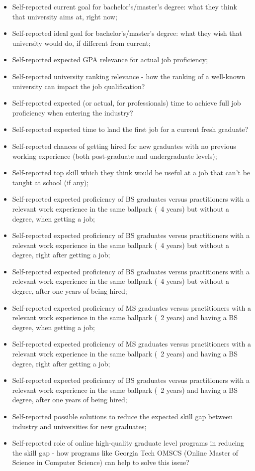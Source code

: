 \documentclass{sigchi}
\begin{document}
\begin{itemize}
	\item Self-reported current goal for bachelor's/master's degree: what they think that university aims at, right now;
	\item Self-reported ideal goal for bachelor's/master's degree: what they wish that university would do, if different from current;
	\item Self-reported expected GPA relevance for actual job proficiency;
	\item Self-reported university ranking relevance - how the ranking of a well-known university can impact the job qualification?
	\item Self-reported expected (or actual, for professionals) time to achieve full job proficiency when entering the industry?
	\item Self-reported expected time to land the first job for a current fresh graduate?
	\item Self-reported chances of getting hired for new graduates with no previous working experience (both post-graduate and undergraduate levels);
	\item Self-reported top skill which they think would be useful at a job that can't be taught at school (if any);
	\item Self-reported expected proficiency of BS graduates versus practitioners with a relevant work experience in the same ballpark (~4 years) but without a degree, when getting a job;
	\item Self-reported expected proficiency of BS graduates versus practitioners with a relevant work experience in the same ballpark (~4 years) but without a degree, right after getting a job;
	\item Self-reported expected proficiency of BS graduates versus practitioners with a relevant work experience in the same ballpark (~4 years) but without a degree, after one years of being hired;
	\item Self-reported expected proficiency of MS graduates versus practitioners with a relevant work experience in the same ballpark (~2 years) and having a BS degree, when getting a job;
	\item Self-reported expected proficiency of MS graduates versus practitioners with a relevant work experience in the same ballpark (~2 years) and having a BS degree, right after getting a job;
	\item Self-reported expected proficiency of BS graduates versus practitioners with a relevant work experience in the same ballpark (~2 years) and having a BS degree, after one years of being hired;
	\item Self-reported possible solutions to reduce the expected skill gap between industry and universities for new graduates; 
	\item Self-reported role of online high-quality graduate level programs in reducing the skill gap - how programs like Georgia Tech OMSCS (Online Master  of Science in Computer Science) can help to solve this issue?
\end{itemize}
 
\end{document}
